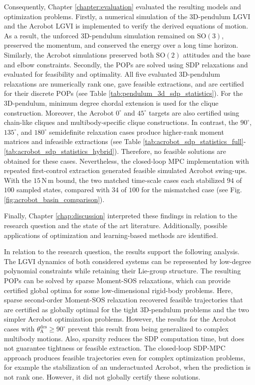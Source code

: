 Consequently, Chapter \ref{chapter:evaluation} 
evaluated the resulting models and optimization problems. 
Firstly, a numerical simulation of the 3D-pendulum LGVI 
and the Acrobot LGVI is implemented to verify the derived equations of motion.
As a result, the unforced 3D-pendulum simulation remained on $\mathrm{SO}(3)$, 
preserved the momentum, and conserved the energy over a long time horizon. 
Similarly, the Acrobot simulations preserved both $\mathrm{SO}(2)$ attitudes and 
the base and elbow constraints. 
Secondly, the POPs are solved using SDP relaxations and evaluated for 
feasibility and optimality. All five evaluated 3D-pendulum relaxations 
are numerically rank one, gave feasible extractions, and are certified for 
their discrete POPs (see Table \ref{tab:pendulum_3d_sdp_statistics}). 
For the 3D-pendulum, minimum degree chordal extension
is used for the clique construction. Moreover, the Acrobot $0^\circ$ and $45^\circ$ targets are also 
certified using chain-like cliques and multibody-specific clique constructions. 
In contrast, the $90^\circ$,
$135^\circ$, and $180^\circ$ semidefinite relaxation cases produce higher-rank moment
matrices and infeasible extractions (see Table \ref{tab:acrobot_sdp_statistics_full}-\ref{tab:acrobot_sdp_statistics_hybrid}). 
Therefore, no feasible solutions are obtained for these cases. Nevertheless,
the closed-loop MPC implementation with repeated
first-control extraction generated feasible simulated Acrobot swing-ups. With
the $15\,\mathrm{N\,m}$ bound, the two matched time-scale cases each stabilized
$94$ of $100$ sampled states, compared with $34$ of $100$ for the mismatched
case (see Fig.\ref{fig:acrobot_basin_comparison}). 

Finally, Chapter \ref{chap:discussion} interpreted these findings in relation to the research question and
the state of the art literature. Additionally, possible applications of optimization and learning-based methods are identified.

In relation to the research question, the results support the following analysis. 
The LGVI
dynamics of both considered systems can be represented by low-degree polynomial
constraints while retaining their Lie-group structure. The resulting POPs can be solved by sparse Moment-SOS relaxations, 
which can provide certified global optima for some low-dimensional
rigid-body problems. Here, sparse second-order Moment-SOS relaxation recovered feasible trajectories that
are certified as globally optimal for the tight 3D-pendulum problems and the two
simpler Acrobot optimization problems. However, the results for the Acrobot cases with
$\theta_{\mathrm A}^{\mathrm{des}} \geq 90^\circ$ prevent this result from being
generalized to complex multibody motions. 
Also, sparsity reduces the SDP computation time, 
but does not guarantee tightness or feasible extraction.
The closed-loop SDP-MPC approach produces feasible trajectories 
even for complex optimization problems, for example the stabilization of 
an underactuated Acrobot,
when the prediction is not rank one. However, it did not globally certify 
these solutions.

